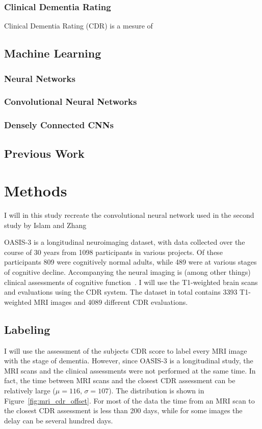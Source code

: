 \documentclass{kththesis}
\begin{document}
\subsection{Clinical Dementia Rating}
Clinical Dementia Rating (CDR) is a mesure of

\section{Machine Learning}
\subsection{Neural Networks}

\subsection{Convolutional Neural Networks}
\subsection{Densely Connected CNNs}

\section{Previous Work}

\chapter{Methods}

I will in this study recreate the convolutional neural network used in the second study by Islam and Zhang

OASIS-3 is a longitudinal neuroimaging dataset, with data collected over the course of 30 years from 1098 participants in various projects. Of these participants 809 were cognitively normal adults, while 489 were at various stages of cognitive decline. Accompanying the neural imaging is (among other things) clinical assessments of cognitive function~\cite{oasis3}. I will use the T1-weighted brain scans and evaluations using the CDR system. The dataset in total contains 3393 T1-weighted MRI images and 4089 different CDR evaluations.

\section{Labeling}
I will use the assessment of the subjects CDR score to label every MRI image with the stage of dementia. However, since OASIS-3 is a longitudinal study, the MRI scans and the clinical assessments were not performed at the same time. In fact, the time between MRI scans and the closest CDR assessment can be relatively large ($\mu=116$, $\sigma=107$). The distribution is shown in Figure~\ref{fig:mri_cdr_offset}. For most of the data the time from an MRI scan to the closest CDR assessment is less than 200 days, while for some images the delay can be several hundred days.
\end{document}
